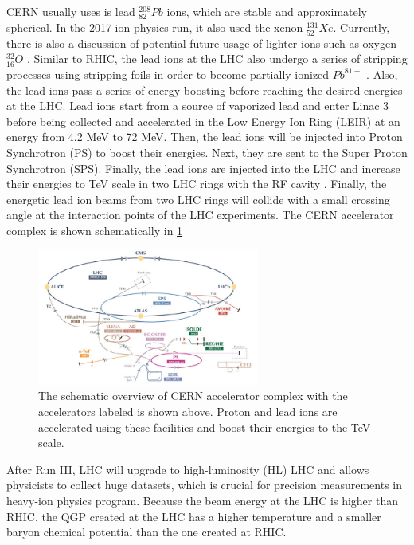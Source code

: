 CERN usually uses is lead ${}^{208}_{82} Pb$ ions, which are stable and approximately spherical. In the 2017 ion physics run, it also used the xenon ${}^{131}_{52} Xe$. Currently, there is also a discussion of potential future usage of lighter ions such as oxygen ${}^{32}_{16} O$ \cite{OORun}. Similar to RHIC, the lead ions at the LHC also undergo a series of stripping processes using stripping foils in order to become partially ionized $Pb^{81+}$ \cite{LHCStrip}. Also, the lead ions pass a series of energy boosting before reaching the desired energies at the LHC. Lead ions start from a source of vaporized lead and enter Linac 3 before being collected and accelerated in the Low Energy Ion Ring (LEIR) at an energy from 4.2 MeV to 72 MeV. Then, the lead ions will be injected into Proton Synchrotron (PS) to boost their energies. Next, they are sent to the Super Proton Synchrotron (SPS). Finally, the lead ions are injected into the LHC and increase their energies to TeV scale in two LHC rings with the RF cavity \cite{LHCReport}. Finally, the energetic lead ion beams from two LHC rings will collide with a small crossing angle at the interaction points of the LHC experiments. The CERN accelerator complex is shown schematically in \ref{CERNAccComplex} 


\begin{figure}[hbtp]
\begin{center}
\includegraphics[width=0.65\textwidth]{Figures/Chapter1/CERNAccComplex.jpg}
\caption{The schematic overview of CERN accelerator complex with the accelerators labeled is shown above. Proton and lead ions are accelerated using these facilities and boost their energies to the TeV scale.}
\label{CERNAccComplex}
\end{center}
\end{figure} 

After Run III, LHC will upgrade to high-luminosity (HL) LHC and allows physicists to collect huge datasets, which is crucial for precision measurements in heavy-ion physics program. Because the beam energy at the LHC is higher than RHIC, the QGP created at the LHC has a higher temperature and a smaller baryon chemical potential than the one created at RHIC.  

